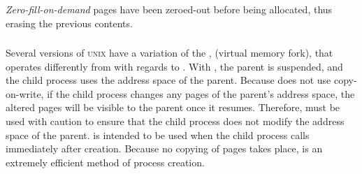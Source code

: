 \begin{definition}\label{def:Zero_Fill_on_Demand}
  \emph{Zero-fill-on-demand} pages have been zeroed-out before being allocated, thus erasing the previous contents.
\end{definition}

\subsubsection{\texorpdfstring{}{\texttt{vfork()}}}\label{subsubsec:vfork}
Several versions of \textsc{unix} have a variation of the  ,  (virtual memory fork), that operates differently from  with regards to .
With , the parent  is suspended, and the child process uses the address space of the parent.
Because  does not use copy-on-write, if the child process changes any pages of the parent’s address space, the altered pages will be visible to the parent once it resumes.
Therefore,  must be used with caution to ensure that the child process does not modify the address space of the parent.
 is intended to be used when the child process calls  immediately after creation.
Because no copying of pages takes place,  is an extremely efficient method of process creation.

